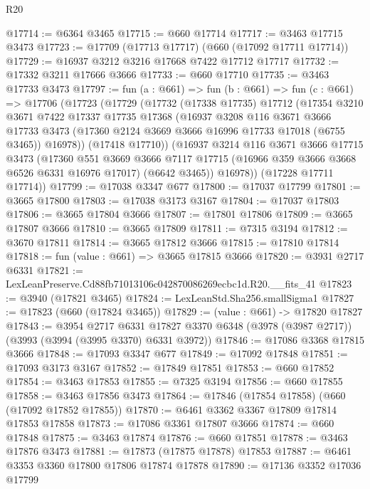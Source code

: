 \begin{lexlean}{R20}
\begin{coremodule}
@17714 := @6364 @3465
@17715 := @660 @17714
@17717 := @3463 @17715 @3473
@17723 := @17709 (@17713 @17717) (@660 (@17092 @17711 @17714))
@17729 := @16937 @3212 @3216 @17668 @7422 @17712 @17717
@17732 := @17332 @3211 @17666 @3666
@17733 := @660 @17710
@17735 := @3463 @17733 @3473
@17797 := fun (a : @661) =>
  fun (b : @661) =>
  fun (c : @661) =>
  @17706
    (@17723
      (@17729
        (@17732
          (@17338 @17735)
          @17712
          (@17354
            @3210
            @3671
            @7422
            @17337
            @17735
            @17368
            (@16937
              @3208
              @116
              @3671
              @3666
              @17733
              @3473
              (@17360 @2124 @3669 @3666 @16996 @17733 @17018 (@6755 @3465))
              @16978))
          (@17418 @17710))
        (@16937
          @3214
          @116
          @3671
          @3666
          @17715
          @3473
          (@17360
            @551
            @3669
            @3666
            @7117
            @17715
            (@16966 @359 @3666 @3668 @6526 @6331 @16976 @17017)
            (@6642 @3465))
          @16978))
      (@17228 @17711 @17714))
@17799 := @17038 @3347 @677
@17800 := @17037 @17799
@17801 := @3665 @17800
@17803 := @17038 @3173 @3167
@17804 := @17037 @17803
@17806 := @3665 @17804 @3666
@17807 := @17801 @17806
@17809 := @3665 @17807 @3666
@17810 := @3665 @17809
@17811 := @7315 @3194
@17812 := @3670 @17811
@17814 := @3665 @17812 @3666
@17815 := @17810 @17814
@17818 := fun (value : @661) => @3665 @17815 @3666
@17820 := @3931 @2717 @6331
@17821 := LexLeanPreserve.Cd88fb71013106c042870086269ecbc1d.R20.__fits_41
@17823 := @3940 (@17821 @3465)
@17824 := LexLeanStd.Sha256.smallSigma1
@17827 := @17823 (@660 (@17824 @3465))
@17829 := (value : @661) -> @17820 @17827
@17843 := @3954
    @2717
    @6331
    @17827
    @3370
    @6348
    (@3978 (@3987 @2717))
    (@3993 (@3994 (@3995 @3370) @6331 @3972))
@17846 := @17086 @3368 @17815 @3666
@17848 := @17093 @3347 @677
@17849 := @17092 @17848
@17851 := @17093 @3173 @3167
@17852 := @17849 @17851
@17853 := @660 @17852
@17854 := @3463 @17853
@17855 := @7325 @3194
@17856 := @660 @17855
@17858 := @3463 @17856 @3473
@17864 := @17846 (@17854 @17858) (@660 (@17092 @17852 @17855))
@17870 := @6461 @3362 @3367 @17809 @17814 @17853 @17858
@17873 := @17086 @3361 @17807 @3666
@17874 := @660 @17848
@17875 := @3463 @17874
@17876 := @660 @17851
@17878 := @3463 @17876 @3473
@17881 := @17873 (@17875 @17878) @17853
@17887 := @6461 @3353 @3360 @17800 @17806 @17874 @17878
@17890 := @17136 @3352 @17036 @17799

\end{coremodule}
\end{lexlean}
